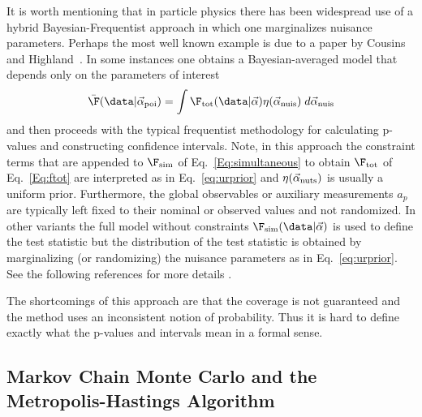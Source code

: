 It is worth mentioning that in particle physics there has been widespread use of a hybrid Bayesian-Frequentist approach in which one marginalizes nuisance parameters.  Perhaps the most well known example is due to a paper by Cousins and Highland~\cite{CousinsHighland:1991qz}.  In some instances one obtains a Bayesian-averaged model that depends only on the parameters of interest
\begin{equation}
\bar{\F}(\data | \vec\alpha_{\rm poi}) = \int  \F_{\rm tot}(\data | \vec\alpha) \eta(\vec\alpha_{\rm nuis}) \; d\vec\alpha_{\rm nuis}
\end{equation}
and then proceeds with the typical frequentist methodology for calculating p-values and constructing confidence intervals. Note, in this approach the constraint terms that are appended to $\F_{\rm sim}$ of Eq.~\ref{Eq:simultaneous} to obtain $\F_{\rm tot}$ of Eq.~\ref{Eq:ftot} are interpreted as in Eq.~\ref{eq:urprior} and $\eta(\vec\alpha_{\rm nuts})$ is usually a uniform prior.  Furthermore, the global observables or auxiliary measurements $a_p$ are typically left fixed to their nominal or observed values and not randomized.
In other variants the full model without constraints $\F_{\rm sim}(\data | \vec\alpha)$ is used to define the test statistic but the distribution of the test statistic is obtained by marginalizing (or randomizing) the nuisance parameters as in Eq.~\ref{eq:urprior}.  See the following references for more details  \cite{Conrad:2005zm,Tegenfeldt:2004dk,Conrad:2002ur,Conrad:2002kn,Rolke:2004mj,PhysRevD.67.118101,Demortier:2007zz,Cousins:2008zz}.  


The shortcomings of this approach are that the coverage is not guaranteed and the method uses an inconsistent notion of probability.  Thus it is hard to define exactly what the p-values and intervals mean in a formal sense.


\subsection{Markov Chain Monte Carlo and the Metropolis-Hastings Algorithm}



